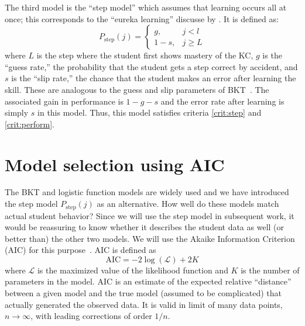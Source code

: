 \documentclass{acmlarge-edm}
\begin{document}
The third model is the ``step model'' which assumes that learning 
occurs all at once; this corresponds to the ``eureka learning''
discusse by \cite{baker_detecting_2011}.  It is defined as:
%
\begin{equation}
    P_\mathrm{step}(j)= \left\{\begin{array}{cc}
                 g, & j<l \\
                 1-s, & j\ge L 
                 \end{array} \right. 
\end{equation}
%
where $L$ is the step where the student first shows mastery of the KC,
$g$ is the ``guess rate,'' the probability that the student gets a
step correct by accident, and $s$ is the ``slip rate,'' the chance
that the student makes an error after learning the skill.  These are
analogous to the guess and slip parameters of
BKT~\cite{corbett_knowledge_1995}.  The associated gain in performance
is $1-g-s$ and the error rate after learning is simply $s$ in this
model.  Thus, this model satisfies criteria \ref{crit:step} and
\ref{crit:perform}.

\section{Model selection using AIC}
\label{model-selection}

The BKT and logistic function models are widely used and
we have introduced the step model $P_\mathrm{step}(j)$
as an alternative.  How
well do these models match actual student behavior?
Since we will use the step model in subsequent
work, it would be reassuring to know whether it describes the student data as 
well (or better than) the other two models.  We will use the Akaike Information Criterion (AIC) for this purpose~\cite{akaike_new_1974,burnham_model_2002}.
AIC is defined as
%
\begin{equation}
   \mathrm{AIC}= -2 \log\left(\mathcal{L}\right) + 2K
\end{equation}
% 
where $\mathcal{L}$ is the maximized value of the likelihood function
and $K$ is the number of parameters in the model.
 AIC is an estimate of the expected relative ``distance''
between a given model and the true model (assumed to be complicated) 
that actually generated the observed data.  It is valid in limit of 
many data points, $n\to\infty$, with leading corrections of order $1/n$.
\end{document}

